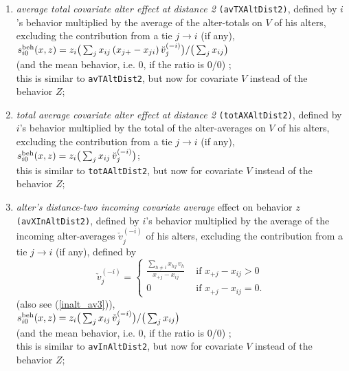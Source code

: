 \documentclass[a4paper,fleqn,11pt]{article}
\newcommand{\+}{\, + \,}
\newcommand{\vit}{\theenumi}
\begin{document}
\begin{enumerate}
 \item {\em average total covariate alter effect at distance 2} \texttt{(avTXAltDist2)},
 defined by  $i$'s
 behavior multiplied by the average of the alter-totals on $V$ of his alters,
 excluding the contribution from a tie $j \rightarrow i$ (if any),\\[0.3ex]
 $s^{\rm beh}_{i\vit}(x, z) =  z_i \big( \sum_j x_{ij}\,(x_{j+}- x_{ji}) \, \breve v_j^{(-i)} \big)
                                / \big (\sum_j x_{ij}\big)  $\\[0.5ex]
 (and the mean behavior, i.e. $0$, if the ratio is 0/0) ;\\
 this is similar to \texttt{avTAltDist2}, but now for covariate $V$
 instead of the behavior $Z$;

 \item {\em total average covariate alter effect at distance 2} \texttt{(totAXAltDist2)},
 defined by  $i$'s
 behavior multiplied by the total of the alter-averages on $V$ of his alters,
 excluding the contribution from a tie $j \rightarrow i$ (if any), \\[0.3ex]
 $s^{\rm beh}_{i\vit}(x, z) =  z_i \big( \sum_j x_{ij}\, \breve v_j^{(-i)} \big) $;\\[0.5ex]
 this is similar to \texttt{totAAltDist2}, but now for covariate $V$
 instead of the behavior $Z$;

 \item {\em alter's distance-two incoming covariate average} effect on behavior $z$ \texttt{(avXInAltDist2)},
 defined by  $i$'s
 behavior multiplied by the average of the incoming alter-averages $\check v_j^{(-i)}$ of his alters,
 excluding the contribution from a tie $j \rightarrow i$ (if any),
 defined by
\begin{equation}
  \check v_j^{(-i)} = \left\{\begin{array}{ll} \displaystyle
         \frac{\sum_{h \neq i} x_{hj}\,v_h}{x_{+j} - x_{ij}}  &
                                       \text{ if } x_{+j} - x_{ij} > 0     \\
         0                                &  \text{ if } x_{+j}- x_{ij} = 0  .
  \end{array}   \right.            \label{inalt_av4}
\end{equation}
(also see (\ref{inalt_av3})), \\
 $s^{\rm beh}_{i\vit}(x, z) =  z_i \big( \sum_j x_{ij}\, \check v_j^{(-i)} \big)
                                / \big (\sum_j x_{ij}\big)  $\\[0.5ex]
 (and the mean behavior, i.e. $0$, if the ratio is 0/0) ;\\
 this is similar to \texttt{avInAltDist2}, but now for covariate $V$
 instead of the behavior $Z$;


\end{enumerate}
\end{document}
